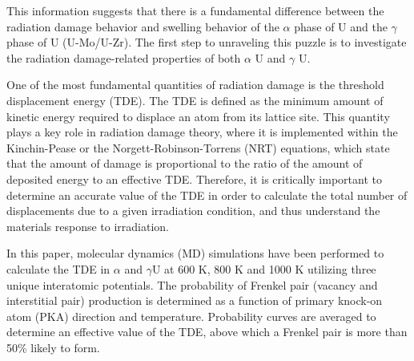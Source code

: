 \documentclass[review]{elsarticle}
\begin{document}
This information suggests that there is a fundamental difference between the radiation damage behavior and swelling behavior of the $\alpha$ phase of U and the $\gamma$ phase of U (U-Mo/U-Zr). The first step to unraveling this puzzle is to investigate the radiation damage-related properties of both $\alpha$ U and $\gamma$ U.

One of the most fundamental quantities of radiation damage is the threshold displacement energy (TDE). The TDE is defined as the minimum amount of kinetic energy required to displace an atom from its lattice site. This quantity plays a key role in radiation damage theory, where it is implemented within the Kinchin-Pease \cite{kinchinpease} or the Norgett-Robinson-Torrens (NRT) \cite{norgett1975} equations, which state that the amount of damage is proportional to the ratio of the amount of deposited energy to an effective TDE. Therefore, it is critically important to determine an accurate value of the TDE in order to calculate the total number of displacements due to a given irradiation condition, and thus understand the materials response to irradiation.

In this paper, molecular dynamics (MD) simulations have been performed to calculate the TDE in $\alpha$ and $\gamma$U at 600 K, 800 K and 1000 K utilizing three unique interatomic potentials. The probability of Frenkel pair (vacancy and interstitial pair) production is determined as a function of primary knock-on atom (PKA) direction and temperature. Probability curves are averaged to determine an effective value of the TDE, above which a Frenkel pair is more than 50$\%$ likely to form. 
\end{document}
